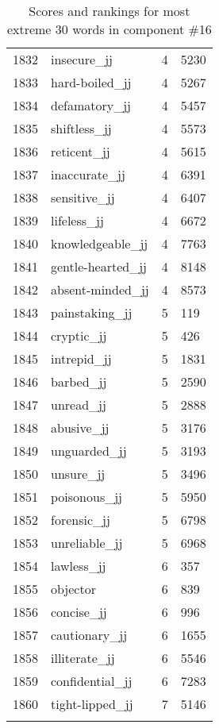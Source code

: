 \begin{longtable}[!htbp]{| rlr@{.}l |}
    1832 & insecure\_jj & 4 & 5230 \\
    1833 & hard-boiled\_jj & 4 & 5267 \\
    1834 & defamatory\_jj & 4 & 5457 \\
    1835 & shiftless\_jj & 4 & 5573 \\
    1836 & reticent\_jj & 4 & 5615 \\
    1837 & inaccurate\_jj & 4 & 6391 \\
    1838 & sensitive\_jj & 4 & 6407 \\
    1839 & lifeless\_jj & 4 & 6672 \\
    1840 & knowledgeable\_jj & 4 & 7763 \\
    1841 & gentle-hearted\_jj & 4 & 8148 \\
    1842 & absent-minded\_jj & 4 & 8573 \\
    1843 & painstaking\_jj & 5 & 119 \\
    1844 & cryptic\_jj & 5 & 426 \\
    1845 & intrepid\_jj & 5 & 1831 \\
    1846 & barbed\_jj & 5 & 2590 \\
    1847 & unread\_jj & 5 & 2888 \\
    1848 & abusive\_jj & 5 & 3176 \\
    1849 & unguarded\_jj & 5 & 3193 \\
    1850 & unsure\_jj & 5 & 3496 \\
    1851 & poisonous\_jj & 5 & 5950 \\
    1852 & forensic\_jj & 5 & 6798 \\
    1853 & unreliable\_jj & 5 & 6968 \\
    1854 & lawless\_jj & 6 & 357 \\
    1855 & objector & 6 & 839 \\
    1856 & concise\_jj & 6 & 996 \\
    1857 & cautionary\_jj & 6 & 1655 \\
    1858 & illiterate\_jj & 6 & 5546 \\
    1859 & confidential\_jj & 6 & 7283 \\
    1860 & tight-lipped\_jj & 7 & 5146 \\
    \hline
    \caption{Scores and rankings for most extreme 30 words in component \#16} \\
\end{longtable}
